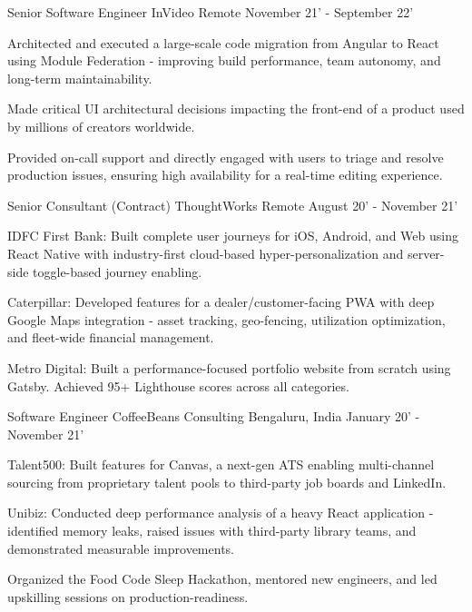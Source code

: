\begin{cventries}
  \cventry
    {Senior Software Engineer} %
    {InVideo} %
    {Remote} %
    {November 21' - September 22'} %
    {
		\begin{cvitems} %
			\item {Architected and executed a large-scale code migration from Angular to React using Module Federation - improving build performance, team autonomy, and long-term maintainability.}
			\item {Made critical UI architectural decisions impacting the front-end of a product used by millions of creators worldwide.}
			\item {Provided on-call support and directly engaged with users to triage and resolve production issues, ensuring high availability for a real-time editing experience.}
		\end{cvitems}
    }

  \cventry
    {Senior Consultant (Contract)} %
    {ThoughtWorks} %
    {Remote} %
    {August 20' - November 21'} %
    {
		\begin{cvitems} %
			\item {IDFC First Bank: Built complete user journeys for iOS, Android, and Web using React Native with industry-first cloud-based hyper-personalization and server-side toggle-based journey enabling.}
			\item {Caterpillar: Developed features for a dealer/customer-facing PWA with deep Google Maps integration - asset tracking, geo-fencing, utilization optimization, and fleet-wide financial management.}
			\item {Metro Digital: Built a performance-focused portfolio website from scratch using Gatsby. Achieved 95+ Lighthouse scores across all categories.}
		\end{cvitems}
    }

  \cventry
    {Software Engineer} %
    {CoffeeBeans Consulting} %
    {Bengaluru, India} %
    {January 20' - November 21'} %
    {
		\begin{cvitems} %
			\item {Talent500: Built features for Canvas, a next-gen ATS enabling multi-channel sourcing from proprietary talent pools to third-party job boards and LinkedIn.}
			\item {Unibiz: Conducted deep performance analysis of a heavy React application - identified memory leaks, raised issues with third-party library teams, and demonstrated measurable improvements.}
			\item {Organized the Food Code Sleep Hackathon, mentored new engineers, and led upskilling sessions on production-readiness.}
		\end{cvitems}
    }


\end{cventries}
